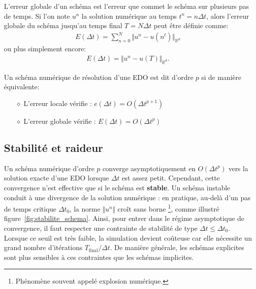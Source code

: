 \begin{definition}
    L'erreur globale d'un schéma est l'erreur que commet le schéma sur plusieurs pas de temps. 
    Si l'on note $u^n$ la solution numérique au temps $t^n = n \Delta t$, alors l'erreur globale du schéma jusqu'au temps final $T = N \Delta t$ peut être définie comme:
    \begin{align}
        E(\Delta t) = \sum_{n=0}^N \Vert u^n - u(n^t) \Vert_{\mathbb{R}^d}
    \end{align}
    ou plus simplement encore:
    \begin{align}
        E(\Delta t)=\Vert u^n - u(T) \Vert_{\mathbb{R}^d}.
    \end{align}
\end{definition}

\begin{definition}
    Un schéma numérique de résolution d'une EDO est dit d'ordre $p$ si de manière équivalente:
    \begin{itemize}
        \item[$\diamond$] L'erreur locale vérifie : $e(\Delta t) = O(\Delta t^{p+1})$
        \item[$\diamond$] L'erreur globale vérifie : $E(\Delta t) = O(\Delta t^{p})$
    \end{itemize}
\end{definition}



\subsection{Stabilité et raideur}\label{par:stabilite_edo}

Un schéma numérique d'ordre $p$ converge asymptotiquement en $O(\Delta t^p)$ vers la solution exacte d'une EDO lorsque $\Delta t$ est assez petit.
Cependant, cette convergence n'est effective que si le schéma est \textbf{stable}.  
Un schéma instable conduit à une divergence de la solution numérique : en pratique, au-delà d'un pas de temps critique $\Delta t_0$, la norme $\Vert u^n \Vert$ croît sans borne%
\footnote{Phénomène souvent appelé \og explosion numérique\fg.}, comme illustré figure~\ref{fig:stabilite_schema}.
Ainsi, pour entrer dans le régime asymptotique de convergence, il faut respecter une contrainte de stabilité de type $\Delta t \leq \Delta t_0$.  
Lorsque ce seuil est très faible, la simulation devient coûteuse car elle nécessite un grand nombre d'itérations $T_\mathrm{final}/\Delta t$.  
De manière générale, les schémas explicites sont plus sensibles à ces contraintes que les schémas implicites.

